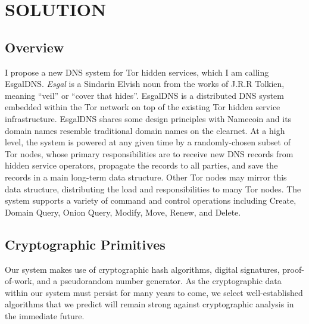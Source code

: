 
\chapter{SOLUTION}

\section{Overview}

I propose a new DNS system for Tor hidden services, which I am calling EsgalDNS. \emph{Esgal} is a Sindarin Elvish noun from the works of J.R.R Tolkien, meaning ``veil'' or ``cover that hides''.\cite{SindarinDict} EsgalDNS is a distributed DNS system embedded within the Tor network on top of the existing Tor hidden service infrastructure. EsgalDNS shares some design principles with Namecoin and its domain names resemble traditional domain names on the clearnet. At a high level, the system is powered at any given time by a randomly-chosen subset of Tor nodes, whose primary responsibilities are to receive new DNS records from hidden service operators, propagate the records to all parties, and save the records in a main long-term data structure. Other Tor nodes may mirror this data structure, distributing the load and responsibilities to many Tor nodes. The system supports a variety of command and control operations including Create, Domain Query, Onion Query, Modify, Move, Renew, and Delete.


\section{Cryptographic Primitives}

Our system makes use of cryptographic hash algorithms, digital signatures, proof-of-work, and a pseudorandom number generator. As the cryptographic data within our system must persist for many years to come, we select well-established algorithms that we predict will remain strong against cryptographic analysis in the immediate future.

